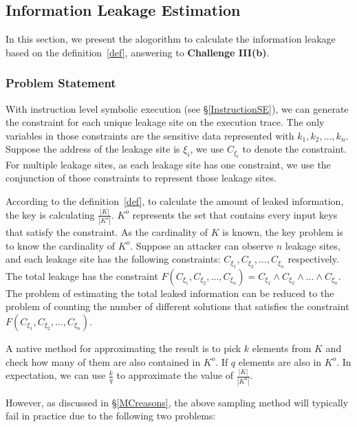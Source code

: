 \subsection{Information Leakage Estimation}

\newcommand{\addr}[1]{{l}_{#1}}
\renewcommand{\addr}[1]{{\gamma}_{#1}}
\renewcommand{\addr}[1]{{\zeta}_{#1}}
\renewcommand{\addr}[1]{{\xi}_{#1}}

In this section, we present the alogorithm to calculate the information
leakage based on the definition~\ref{def}, answering to
\textbf{Challenge III(b)}. 

\subsubsection{Problem Statement}
With instruction level symbolic execution (see \S\ref{InstructionSE}), we can generate the constraint 
for each unique leakage site on the execution trace.
The only variables in those constraints are the sensitive data represented
with $k_1, k_2, \ldots , k_n$. Suppose the address of the leakage site is $\addr{i}$,
we use $C_{\addr{i}}$ to denote the constraint. For multiple leakage sites, 
as each leakage site has one constraint, we 
use the conjunction of those constraints to represent those leakage sites. 

According to the definition~\ref{def}, to calculate the amount of leaked 
information, the key is calculating $\frac{|K|}{|K^o|}$. $K^o$ represents
the set that contains every input keys that satisfy the constraint. As the 
cardinality of $K$ is known, the key problem is to know the cardinality of
$K^o$. Suppose an attacker can observe $n$ leakage sites, and each leakage site has
the following constraints: $C_{\addr{1}}, C_{\addr{2}}, \ldots, C_{\addr{n}}$ respectively. 
The total leakage has the constraint 
$F(C_{\addr{1}},C_{\addr{2}},\ldots,C_{\addr{n}}) = C_{\addr{1}} \land C_{\addr{2}} 
\land \ldots \land C_{\addr{n}}$. The problem of estimating the total leaked information 
can be reduced to the problem of counting the number of different solutions 
that satisfies the constraint $F(C_{\addr{1}},C_{\addr{2}},\ldots,C_{\addr{n}})$. 

A native method for approximating 
the result is to pick $k$ elements from $K$ and check how many of them are also
contained in $K^o$. If $q$ elements are also in $K^o$. In expectation, we can
use $\frac{k}{q}$ to approximate the value of $\frac{|K|}{|K^o|}$.

However, as discussed in \S\ref{MCreasons},
the above sampling method will typically fail in practice due to the following two problems:


